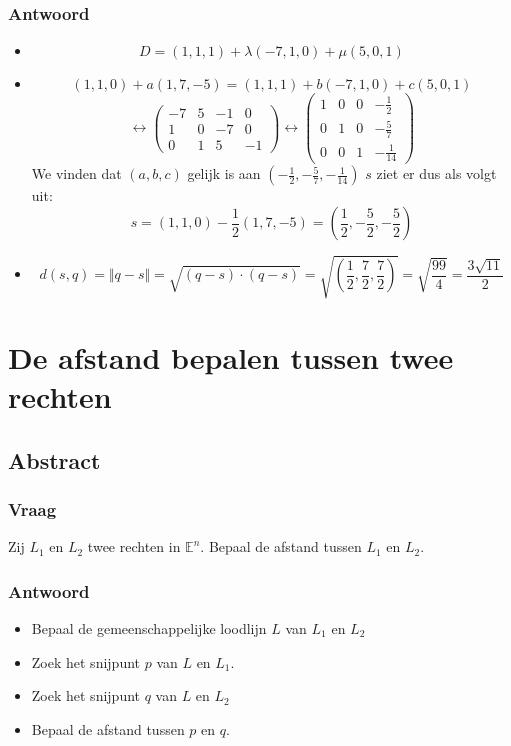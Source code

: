 \documentclass[main.tex]{subfiles}
\begin{document}
\subsubsection*{Antwoord}
\begin{itemize}
\item 
  \[
  D = (1,1,1) + \lambda(-7,1,0) + \mu(5,0,1)
  \]
\item 
  \[
  (1,1,0) + a(1,7,-5) = (1,1,1) + b(-7,1,0) + c(5,0,1)
  \]
  \[
  \longleftrightarrow
  \begin{pmatrix}
    -7 & 5  & -1 & 0\\
    1  & 0  & -7 & 0\\
    0  & 1  &  5 & -1
  \end{pmatrix}
  \longleftrightarrow
  \begin{pmatrix}
    1  & 0  &  0 & -\frac{1}{2}\\
    0  & 1  &  0 & -\frac{5}{7}\\
    0  & 0  &  1 & -\frac{1}{14}
  \end{pmatrix}
  \]
  We vinden dat $(a,b,c)$ gelijk is aan $\left(-\frac{1}{2}, -\frac{5}{7}, -\frac{1}{14} \right)$
  $s$ ziet er dus als volgt uit:
  \[ s = (1,1,0) - \frac{1}{2}(1,7,-5)= (\frac{1}{2},-\frac{5}{2},-\frac{5}{2}) \]
\item
  \[ d(s,q) = \Vert q-s \Vert = \sqrt{(q-s)\cdot (q-s)} = \sqrt{\left(\frac{1}{2},\frac{7}{2},\frac{7}{2}\right)} = \sqrt{\frac{99}{4}} = \frac{3\sqrt{11}}{2}\]
\end{itemize}

\newpage
\section{De afstand bepalen tussen twee rechten}
\subsection*{Abstract}
\subsubsection*{Vraag}
\begin{center}
  Zij $L_{1}$ en $L_{2}$ twee rechten in $\mathbb{E}^{n}$.
  Bepaal de afstand tussen $L_{1}$ en $L_{2}$.
\end{center}
\subsubsection*{Antwoord}
\begin{itemize}
\item Bepaal de gemeenschappelijke loodlijn $L$ van $L_{1}$ en $L_{2}$
\item Zoek het snijpunt $p$ van $L$ en $L_{1}$.
\item Zoek het snijpunt $q$ van $L$ en $L_{2}$
\item Bepaal de afstand tussen $p$ en $q$.
\end{itemize}
\end{document}
